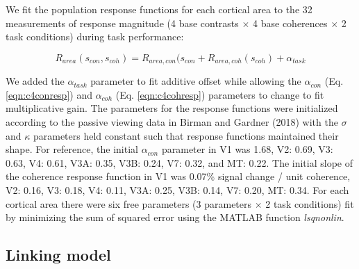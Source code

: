 \documentclass{report}
\begin{document}
We fit the population response functions for each cortical area to the 32 measurements of response magnitude (4 base contrasts $\times$ 4 base coherences $\times$ 2 task conditions) during task performance:

\begin{equation}
    R_{area}(s_{con},s_{coh})=R_{area,con}(s_{con}+R_{area,coh}(s_{coh})+\alpha_{task}
    \label{eqn:c4r_area}
\end{equation}

We added the $\alpha_{task}$ parameter to fit additive offset while allowing the $\alpha_{con}$ (Eq. \ref{eqn:c4conresp}) and $\alpha_{coh}$ (Eq. \ref{eqn:c4cohresp}) parameters to change to fit multiplicative gain. The parameters for the response functions were initialized according to the passive viewing data in Birman and Gardner (2018) with the $\sigma$ and $\kappa$ parameters held constant such that response functions maintained their shape. For reference, the initial $\alpha_{con}$ parameter in V1 was 1.68, V2: 0.69, V3: 0.63, V4: 0.61, V3A: 0.35, V3B: 0.24, V7: 0.32, and MT: 0.22. The initial slope of the coherence response function in V1 was 0.07\% signal change / unit coherence, V2: 0.16, V3: 0.18, V4: 0.11, V3A: 0.25, V3B: 0.14, V7: 0.20, MT: 0.34. For each cortical area there were six free parameters (3 parameters $\times$ 2 task conditions) fit by minimizing the sum of squared error using the MATLAB function \textit{lsqnonlin}.   

\subsection{Linking model}
\end{document}
